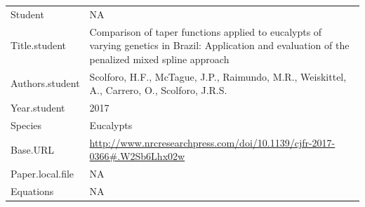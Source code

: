 \documentclass[]{article}
\begin{document}
\begin{longtable}[]{@{}ll@{}}
\toprule
\endhead
\begin{minipage}[t]{0.21\columnwidth}\raggedright
Student\strut
\end{minipage} & \begin{minipage}[t]{0.73\columnwidth}\raggedright
NA\strut
\end{minipage}\tabularnewline
\begin{minipage}[t]{0.21\columnwidth}\raggedright
Title.student\strut
\end{minipage} & \begin{minipage}[t]{0.73\columnwidth}\raggedright
Comparison of taper functions applied to eucalypts of varying genetics
in Brazil: Application and evaluation of the penalized mixed spline
approach\strut
\end{minipage}\tabularnewline
\begin{minipage}[t]{0.21\columnwidth}\raggedright
Authors.student\strut
\end{minipage} & \begin{minipage}[t]{0.73\columnwidth}\raggedright
Scolforo, H.F., McTague, J.P., Raimundo, M.R., Weiskittel, A., Carrero,
O., Scolforo, J.R.S.\strut
\end{minipage}\tabularnewline
\begin{minipage}[t]{0.21\columnwidth}\raggedright
Year.student\strut
\end{minipage} & \begin{minipage}[t]{0.73\columnwidth}\raggedright
2017\strut
\end{minipage}\tabularnewline
\begin{minipage}[t]{0.21\columnwidth}\raggedright
Species\strut
\end{minipage} & \begin{minipage}[t]{0.73\columnwidth}\raggedright
Eucalypts\strut
\end{minipage}\tabularnewline
\begin{minipage}[t]{0.21\columnwidth}\raggedright
Base.URL\strut
\end{minipage} & \begin{minipage}[t]{0.73\columnwidth}\raggedright
\url{http://www.nrcresearchpress.com/doi/10.1139/cjfr-2017-0366\#.W2Sb6Lhx02w}\strut
\end{minipage}\tabularnewline
\begin{minipage}[t]{0.21\columnwidth}\raggedright
Paper.local.file\strut
\end{minipage} & \begin{minipage}[t]{0.73\columnwidth}\raggedright
NA\strut
\end{minipage}\tabularnewline
\begin{minipage}[t]{0.21\columnwidth}\raggedright
Equations\strut
\end{minipage} & \begin{minipage}[t]{0.73\columnwidth}\raggedright
NA\strut
\end{minipage}\tabularnewline
\bottomrule
\end{longtable}
\end{document}
